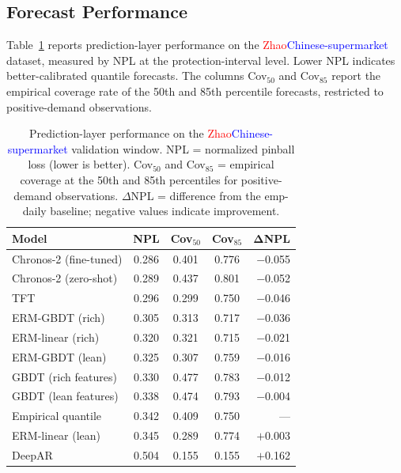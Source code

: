 \documentclass[msom,dblanonrev]{informs4}
\newcommand{\add}[1]{\textcolor{blue}{#1}}
\newcommand{\reduce}[1]{\textcolor{red}{#1}\hspace{0.5em}}
\begin{document}
\subsection{Forecast Performance}

Table~\ref{tab:layer_b} reports prediction-layer performance on the \reduce{Zhao}\add{Chinese-supermarket} dataset, measured by NPL at the protection-interval level.
Lower NPL indicates better-calibrated quantile forecasts.
The columns Cov$_{50}$ and Cov$_{85}$ report the empirical coverage rate of the 50th and 85th percentile forecasts, restricted to positive-demand observations.

\begin{table}[ht]
\caption{Prediction-layer performance on the \reduce{Zhao}\add{Chinese-supermarket} validation window. NPL = normalized pinball loss (lower is better). Cov$_{50}$ and Cov$_{85}$ = empirical coverage at the 50th and 85th percentiles for positive-demand observations. $\Delta$NPL = difference from the \textsf{emp-daily} baseline; negative values indicate improvement.}\label{tab:layer_b}
\centering\small
\begin{tabular}{lcccr}
\toprule
\textbf{Model} & \textbf{NPL} & \textbf{Cov}$_{50}$ & \textbf{Cov}$_{85}$ & $\boldsymbol{\Delta}$\textbf{NPL} \\
\midrule
Chronos-2 (fine-tuned) & 0.286 & 0.401 & 0.776 & $-$0.055 \\
Chronos-2 (zero-shot)  & 0.289 & 0.437 & 0.801 & $-$0.052 \\
TFT                    & 0.296 & 0.299 & 0.750 & $-$0.046 \\
ERM-GBDT (rich)        & 0.305 & 0.313 & 0.717 & $-$0.036 \\
ERM-linear (rich)      & 0.320 & 0.321 & 0.715 & $-$0.021 \\
ERM-GBDT (lean)        & 0.325 & 0.307 & 0.759 & $-$0.016 \\
GBDT (rich features)   & 0.330 & 0.477 & 0.783 & $-$0.012 \\
GBDT (lean features)   & 0.338 & 0.474 & 0.793 & $-$0.004 \\
Empirical quantile     & 0.342 & 0.409 & 0.750 & ---      \\
ERM-linear (lean)      & 0.345 & 0.289 & 0.774 & $+$0.003 \\
DeepAR                 & 0.504 & 0.155 & 0.155 & $+$0.162 \\
\bottomrule
\end{tabular}
\end{table}
\end{document}
